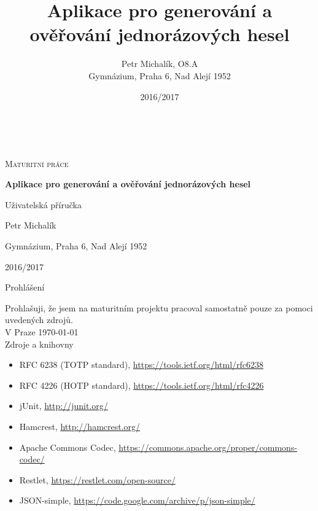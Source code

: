 \documentclass[12pt,opeany,a4paper,twoside]{book}
\author{Petr Michalík, O8.A\\Gymnázium, Praha 6, Nad Alejí 1952}
\title{Aplikace pro generování a ověřování jednorázových hesel}
\date{2016/2017}
\begin{document}
\begin{titlepage}
	\centering	
	{~\par}
	\vspace{4cm}
	{\scshape\LARGE  Maturitní práce  \par}
	\vspace{1cm}
	{\huge\bfseries Aplikace pro generování a ověřování jednorázových hesel \par}
	\vspace{1cm}
	{\large Uživatelská příručka \par}
	\vspace{4cm}
	
	\vfill
	
	{\large Petr Michalík \par}
	{\large Gymnázium, Praha 6, Nad Alejí 1952 \par}
	{\large 2016/2017\par}
\end{titlepage}

\pagestyle{plain}
\setcounter{page}{2}
\justify
{\normalfont\huge Prohlášení}
\vspace{2cm}

\raggedright
Prohlašuji, že jsem na maturitním projektu pracoval samostatně pouze za pomoci uvedených zdrojů.
\\
\vfill
{V Praze \today}
\\
\clearpage
\shorthandoff{-}\shorthandon{-}
\justify
{\normalfont\huge Zdroje a knihovny}
\vspace{2cm}

\begin{itemize}
\item RFC 6238 (TOTP standard), \url{https://tools.ietf.org/html/rfc6238}
\item RFC 4226 (HOTP standard), \url{https://tools.ietf.org/html/rfc4226}
\item jUnit, \url{http://junit.org/}
\item Hamcrest, \url{http://hamcrest.org/}
\item Apache Commons Codec, \url{https://commons.apache.org/proper/commons-codec/}
\item Restlet, \url{https://restlet.com/open-source/}
\item JSON-simple, \url{https://code.google.com/archive/p/json-simple/}
\end{itemize}
\end{document}
